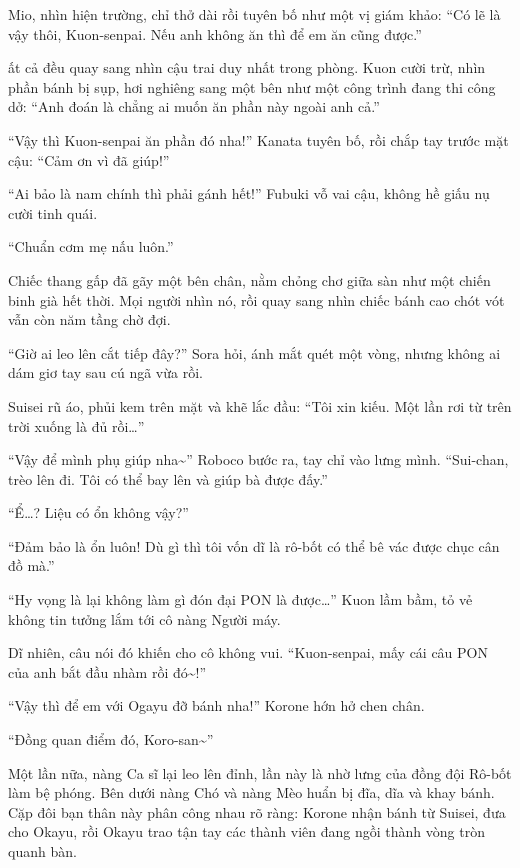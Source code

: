 \documentclass[../main.tex]{subfiles}
\begin{document}
Mio, nhìn hiện trường, chỉ thở dài rồi tuyên bố như một vị giám khảo: ``Có lẽ là vậy thôi, Kuon-senpai. Nếu anh không ăn thì để em ăn cũng được.''

ất cả đều quay sang nhìn cậu trai duy nhất trong phòng. Kuon cười trừ, nhìn phần bánh bị sụp, hơi nghiêng sang một bên như một công trình đang thi công dở: ``Anh đoán là chẳng ai muốn ăn phần này ngoài anh cả.''

``Vậy thì Kuon-senpai ăn phần đó nha!'' Kanata tuyên bố, rồi chắp tay trước mặt cậu: ``Cảm ơn vì đã giúp!''

``Ai bảo là nam chính thì phải gánh hết!'' Fubuki vỗ vai cậu, không hề giấu nụ cười tinh quái.

``Chuẩn cơm mẹ nấu luôn.''

\ct

Chiếc thang gấp đã gãy một bên chân, nằm chỏng chơ giữa sàn như một chiến binh già hết thời. Mọi người nhìn nó, rồi quay sang nhìn chiếc bánh cao chót vót vẫn còn năm tầng chờ đợi.

``Giờ ai leo lên cắt tiếp đây?'' Sora hỏi, ánh mắt quét một vòng, nhưng không ai dám giơ tay sau cú ngã vừa rồi.

Suisei rũ áo, phủi kem trên mặt và khẽ lắc đầu: ``Tôi xin kiếu. Một lần rơi từ trên trời xuống là đủ rồi\dots''

``Vậy để mình phụ giúp nha\~{}'' Roboco bước ra, tay chỉ vào lưng mình. ``Sui-chan, trèo lên đi. Tôi có thể bay lên và giúp bà được đấy.''

``Ể\dots? Liệu có ổn không vậy?''

``Đảm bảo là ổn luôn! Dù gì thì tôi vốn dĩ là rô-bốt có thể bê vác được chục cân đồ mà.''

``Hy vọng là lại không làm gì đón đại PON là được\dots'' Kuon lầm bầm, tỏ vẻ không tin tưởng lắm tới cô nàng Người máy.

Dĩ nhiên, câu nói đó khiến cho cô không vui. ``Kuon-senpai, mấy cái câu PON của anh bắt đầu nhàm rồi đó\~{}!''

``Vậy thì để em với Ogayu đỡ bánh nha!'' Korone hớn hở chen chân.

``Đồng quan điểm đó, Koro-san\~{}''

Một lần nữa, nàng Ca sĩ lại leo lên đỉnh, lần này là nhờ lưng của đồng đội Rô-bốt làm bệ phóng. Bên dưới nàng Chó và nàng Mèo huẩn bị đĩa, dĩa và khay bánh. Cặp đôi bạn thân này phân công nhau rõ ràng: Korone nhận bánh từ Suisei, đưa cho Okayu, rồi Okayu trao tận tay các thành viên đang ngồi thành vòng tròn quanh bàn.
\end{document}

